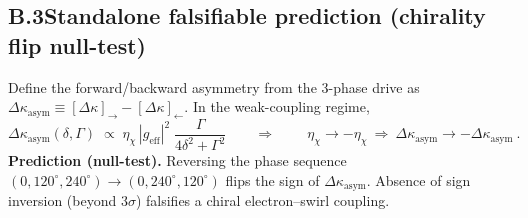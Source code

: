 \documentclass[aps,prb,preprint,amsmath,amssymb]{revtex4-2} %
\begin{document}
    \subsection*{B.3\quad Standalone falsifiable prediction (chirality flip null-test)}
        Define the forward/backward asymmetry from the 3-phase drive as
        \(\Delta\kappa_\textrm{asym}\equiv[\Delta\kappa]_{\rightarrow}-[\Delta\kappa]_{\leftarrow}\).
        In the weak-coupling regime,
        \[
            \Delta\kappa_\textrm{asym}(\delta,\Gamma)\;\propto\; \eta_\chi\,|g_\textrm{eff}|^{2}\;\frac{\Gamma}{4\delta^{2}+\Gamma^{2}}
            \qquad\Rightarrow\qquad
            \boxed{\ \eta_\chi\to-\eta_\chi\ \Longrightarrow\ \Delta\kappa_\textrm{asym}\to-\Delta\kappa_\textrm{asym}\ }.
        \]
        \textbf{Prediction (null-test).} Reversing the phase sequence \((0,120^\circ,240^\circ)\!\to\!(0,240^\circ,120^\circ)\) flips the sign of \(\Delta\kappa_\textrm{asym}\). Absence of sign inversion (beyond \(3\sigma\)) falsifies a chiral electron–swirl coupling.
\end{document}
